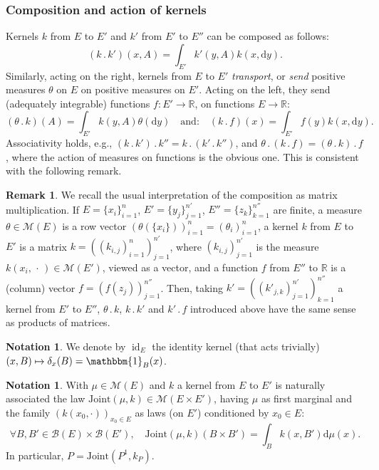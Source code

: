 \documentclass[JEP,XML,SOM,Unicode,NoEqCountersInSection,NoFloatCountersInSection,published]{cedram}
\newcommand{\ldot}{\mathbin{.}}
\newcommand\mto{\mathchoice{\longmapsto}{\mapsto}{\mapsto}{\mapsto}}
\theoremstyle{plain}
\theoremstyle{definition}
\newtheorem{notation}[them]{Notation} %
\newtheorem{rem}[them]{Remark}
\newcommand{\dd}{\mathrm{d}}
\newcommand{\join}{\mathrm{Joint}}
\newcommand{\idk}{\operatorname{id}}
\newcommand{\espace}{E}
\newcommand{\one}{\mathbbm{1}}
\newcommand{\m}{\mathcal{M}}
\newcommand{\R}{\mathbb{R}}
\begin{document}
\subsubsection{Composition and action of kernels}\label{ss:compos} Kernels $k$ from $E$ to $E'$ and $k'$ from $E'$ to $E''$ can be composed as follows:\vspace*{-3pt}
\[(k\ldot k')(x,A)=\int_{E'} k'(y,A) k(x,\dd y).\]
Similarly, acting on the right, kernels from $E$ to $E'$ \emph{transport}, or \emph{send} positive measures $\theta$ on $E$ on positive measures on $E'$. Acting on the left, they send (adequately integrable) functions $f:E'\to \R$, on functions $E\to \R$:\vspace*{-3pt}
\[(\theta\ldot k)(A)=\int_{E'}k(y,A)\theta(\dd y)\quad \text{and:}\quad (k\ldot f)(x)=\int_{E'} f(y) k(x,\dd y).\]
\noindent Associativity holds, e.g., $(k\ldot k')\ldot k''=k\ldot(k'\ldot k'')$, and $\theta\ldot(k\ldot f)=(\theta\ldot k)\ldot f$, where the action of measures on functions is the obvious one. This is consistent with the following remark.

\begin{rem}\label{rem:matrix}
We recall the usual interpretation of the composition as matrix multiplication. If $E=\{x_i\}_{i=1}^{n}$, $E'=\{y_j\}_{j=1}^{n'}$, $E''=\{z_k\}_{k=1}^{n''}$ are finite, a measure $\theta\in\m(E)$ is a row vector $(\theta(\{x_i\}))_{i=1}^{n}=(\theta_i)_{i=1}^{n}$, a kernel $k$ from $E$ to $E'$ is a matrix $k=((k_{i,j})_{i=1}^{n})_{j=1}^{n'}$, where $(k_{i,j})_{j=1}^{n'}$ is the measure $k(x_i,\,\cdot\,)\in\m(E')$, viewed as a vector, and a function $f$ from $E''$ to $\R$ is a (column) vector $f=(f(z_j))_{j=1}^{n''}$. Then, taking $k'=((k'_{j,k})_{j=1}^{n'})_{k=1}^{n''}$ a kernel from $E'$ to $E''$, $\theta\ldot k$, $k\ldot k'$ and $k'\ldot f$ introduced above have the same sense as products of matrices.
\end{rem}

\begin{notation}\label{not:ident} We denote by $\idk_E$ the identity kernel (that acts trivially) $(x,B)\mto\delta_x(B)=\one_B(x)$.
\end{notation}

\begin{notation}\label{notation_join} With $\mu\in\m(E)$ and $k$ a kernel from $E$ to $E'$ is naturally associated the law $\join(\mu,k)\in\m(\espace\times \espace')$, having $\mu$ as first marginal and the family $(k(x_0,\cdot))_{x_0\in E}$ as laws (on $E'$) conditioned by $x_0\in E$:\vspace*{-3pt}
\[\forall B,B'\in{\mathcal B}(E)\times{\mathcal B}(E'),\quad \join(\mu,k)(B\times B')=\int_Bk(x,B')\dd\mu(x).\]
In particular, $P=\join(P^1,k_P)$.
\end{notation}
\end{document}
